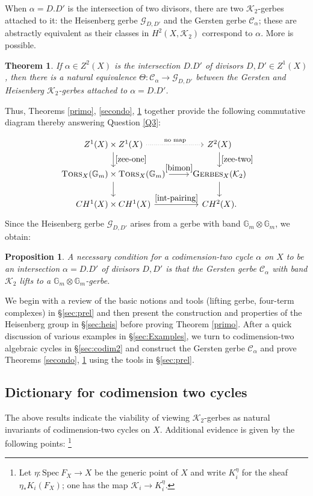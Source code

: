 \documentclass{amsart}
\numberwithin{equation}{subsection}
\newtheorem{theorem}{Theorem}[section]
\newtheorem*{proposition*}{Proposition}
\theoremstyle{remark}
\theoremstyle{remark}
\newcommand{\cC}{\mathcal{C}}
\newcommand{\cG}{\mathcal{G}}
\newcommand{\cK}{\mathcal{K}}
\newcommand{\bbG}{\mathbb{G}}
\DeclareMathOperator{\ger}{\textsc{Gerbes}} %
\DeclareMathOperator{\tors}{\textsc{Tors}} %
\begin{document}
When $\alpha = D.D'$ is the intersection of two divisors, there are two $\cK_2$-gerbes attached to it: the Heisenberg gerbe $\cG_{D,D'}$ and the Gersten gerbe $\cC_{\alpha}$; these are abstractly equivalent as their classes in $H^2(X, \cK_2)$ correspond to $\alpha$. More is possible. 

\begin{theorem}\label{terzo}
If $\alpha \in Z^2(X)$ is the intersection $D.D'$ of divisors $D, D' \in Z^1(X)$, then there is a natural equivalence $\Theta: \cC_{\alpha} \to \cG_{D, D'}$ between the Gersten and Heisenberg $\cK_2$-gerbes attached to $\alpha = D.D'$.
\end{theorem}
Thus, Theorems \ref{primo}, \ref{secondo}, \ref{terzo} together provide the following commutative diagram thereby answering Question \ref{Q3}:

\begin{equation*}
  \begin{tikzcd}
    Z^1(X) \times Z^1(X)  \arrow[r, dotted, "{\textrm{no~map}}"] \arrow{d}{\eqref{zee-one}} & Z^2(X) \arrow{d}{\eqref{zee-two}}\\
    \tors_X(\bbG_m) \times \tors_X(\bbG_m) \arrow{r}{\eqref{bimon}} \arrow{d} & \ger_X(\cK_2) \arrow{d}\\
    CH^1(X) \times CH^1(X) \arrow{r}{\eqref{int-pairing}} & CH^2(X).
  \end{tikzcd}
\end{equation*}
Since the Heisenberg gerbe $\cG_{D,D'}$ arises from a gerbe with band $\bbG_m \otimes \bbG_m$, we obtain: 
\begin{proposition*} A necessary condition for a codimension-two cycle $\alpha$ on $X$ to be an intersection $\alpha = D. D'$ of divisors $D, D'$ is that the Gersten gerbe $\cC_{\alpha}$ with band $\cK_2$ lifts to a $\bbG_m \otimes \bbG_m$-gerbe. 
\end{proposition*}


We begin with a review of the basic notions and tools (lifting gerbe, four-term
complexes) in \S \ref{sec:prel} and then present the construction and properties
of the Heisenberg group in \S \ref{sec:heis} before proving Theorem \ref{primo}.
After a quick discussion of various examples in \S \ref{sec:Examples}, we turn
to codimension-two algebraic cycles in \S \ref{sec:codim2} and construct the
Gersten gerbe $\cC_{\alpha}$ and prove Theorems \ref{secondo}, \ref{terzo} using
the tools in \S \ref{sec:prel}.

\subsection*{Dictionary for codimension two cycles}
The above results indicate the viability of
viewing $\cK_2$-gerbes as natural invariants of codimension-two cycles on
$X$. Additional evidence is given by the following points: \footnote{Let $\eta \colon \textrm{Spec}~F_X\to X$ be the generic point of $X$ and write $K_i^{\eta}$ for the sheaf $\eta_* K_i(F_X)$; one has the map $\cK_i \to K_i^{\eta}$.}
\end{document}
